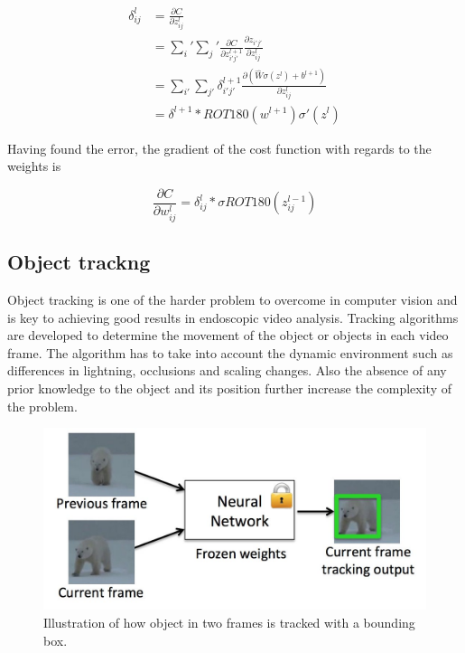 \documentclass[english, a4paper]{report}
\begin{document}
\begin{equation}
  \begin{aligned}
  \delta_{ij}^l &= \frac{\partial C}{\partial z_{ij}^l} \\
  &= \sum_i' \sum_j' \frac{\partial C}{\partial z_{i'j'}^{l+1}}\frac{\partial z_{i'j'}}{\partial z_{ij}^l} \\
  &= \sum_{i'} \sum_{j'}\delta_{i'j'}^{l+1} \frac{\partial (\hat{W}\sigma(z^l) + b^{l+1})}{\partial z_{ij}^l} \\
  &= \delta^{l+1} * ROT180(w^{l+1})\sigma'(z^l)
  \end{aligned}
\end{equation}

Having found the error, the gradient of the cost function with regards to the weights is

\begin{equation} %
  \frac{\partial C}{\partial w_{ij}^l} = \delta_{ij}^l * \sigma{ROT180(z_{ij}^{l-1})}
\end{equation}



\subsection{Object trackng}
Object tracking is one of the harder problem to overcome in computer vision and is key to achieving good results in endoscopic video analysis. Tracking algorithms are developed to determine the movement of the object or objects in each video frame. The algorithm has to take into account the dynamic environment such as differences in lightning, occlusions and scaling changes. Also the absence of any prior knowledge to the object and its position further increase the complexity of the problem.

\begin{figure}[H] %
  \begin{center}
    \includegraphics[width=\textwidth]{object-tracking.jpg}
    \caption{Illustration of how object in two frames is tracked with a bounding box. \cite{GOTURNDeep} }
    \label{fig:object-tracking}
  \end{center}
\end{figure}
\end{document}
